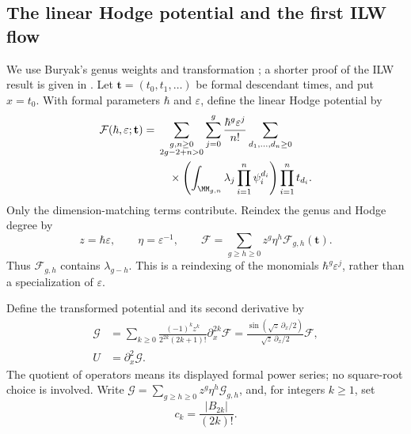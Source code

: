 \subsection{The linear Hodge potential and the first ILW flow}
\label{subsec:s07:01}

We use Buryak's genus weights and transformation
\cite[Theorem~1.1, (1.1)--(1.2)]{Bur15}; a shorter proof of the
ILW result is given in \cite[Theorem~1.1 and Section~2]{Bur16}.
Let $\mathbf t=(t_0,t_1,\ldots)$ be formal descendant times, and put
$x=t_0$. With formal parameters $\hbar$ and $\varepsilon$, define the
linear Hodge potential by
\begin{equation}\label{eq:s07:hodge-potential}
 \begin{aligned}
 \mathcal F(\hbar,\varepsilon;\mathbf t)
 ={}&\sum_{\substack{g,n\geq0\\2g-2+n>0}}
   \sum_{j=0}^g\frac{\hbar^g\varepsilon^j}{n!}
   \sum_{d_1,\ldots,d_n\geq0}\\
 &\quad\times
   \left(\int_{\MM_{g,n}}\lambda_j
                    \prod_{i=1}^n\psi_i^{d_i}\right)
   \prod_{i=1}^n t_{d_i}.
 \end{aligned}
\end{equation}
Only the dimension-matching terms contribute. Reindex the genus and
Hodge degree by
\begin{equation}\label{eq:s07:defect-variables}
 z=\hbar\varepsilon,\qquad \eta=\varepsilon^{-1},\qquad
 \mathcal F=\sum_{g\geq h\geq0}z^g\eta^h
                         \mathcal F_{g,h}(\mathbf t).
\end{equation}
Thus $\mathcal F_{g,h}$ contains $\lambda_{g-h}$. This is a reindexing
of the monomials $\hbar^g\varepsilon^j$, rather than a specialization
of $\varepsilon$.

Define the transformed potential and its second derivative by
\begin{equation}\label{eq:s07:miura}
 \begin{aligned}
 \mathcal G
 &=\sum_{k\geq0}\frac{(-1)^kz^k}{2^{2k}(2k+1)!}
                         \partial_x^{2k}\mathcal F
 =\frac{\sin(\sqrt z\,\partial_x/2)}{\sqrt z\,\partial_x/2}
                         \mathcal F,\\
 U&=\partial_x^2\mathcal G.
 \end{aligned}
\end{equation}
The quotient of operators means its displayed formal power series;
no square-root choice is involved. Write
$\mathcal G=\sum_{g\geq h\geq0}z^g\eta^h\mathcal G_{g,h}$, and, for
integers $k\geq1$, set
\begin{equation}\label{eq:s07:ilw-coefficients}
 c_k=\frac{|B_{2k}|}{(2k)!}.
\end{equation}

